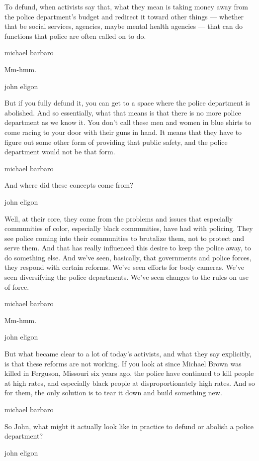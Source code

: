 To defund, when activists say that, what they mean is taking money away
from the police department's budget and redirect it toward other things
--- whether that be social services, agencies, maybe mental health
agencies --- that can do functions that police are often called on to
do.

michael barbaro

Mm-hmm.

john eligon

But if you fully defund it, you can get to a space where the police
department is abolished. And so essentially, what that means is that
there is no more police department as we know it. You don't call these
men and women in blue shirts to come racing to your door with their guns
in hand. It means that they have to figure out some other form of
providing that public safety, and the police department would not be
that form.

michael barbaro

And where did these concepts come from?

john eligon

Well, at their core, they come from the problems and issues that
especially communities of color, especially black communities, have had
with policing. They see police coming into their communities to
brutalize them, not to protect and serve them. And that has really
influenced this desire to keep the police away, to do something else.
And we've seen, basically, that governments and police forces, they
respond with certain reforms. We've seen efforts for body cameras. We've
seen diversifying the police departments. We've seen changes to the
rules on use of force.

michael barbaro

Mm-hmm.

john eligon

But what became clear to a lot of today's activists, and what they say
explicitly, is that these reforms are not working. If you look at since
Michael Brown was killed in Ferguson, Missouri six years ago, the police
have continued to kill people at high rates, and especially black people
at disproportionately high rates. And so for them, the only solution is
to tear it down and build something new.

michael barbaro

So John, what might it actually look like in practice to defund or
abolish a police department?

john eligon

